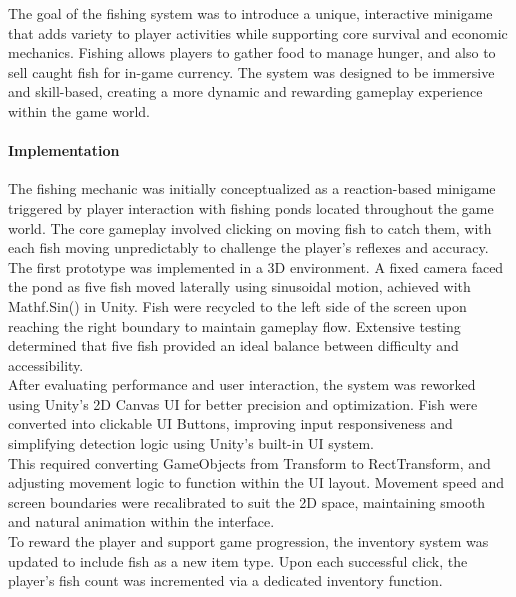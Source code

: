 \documentclass{article}
\begin{document}
The goal of the fishing system was to introduce a unique, interactive minigame that adds variety to player activities while supporting core survival and economic mechanics. Fishing allows players to gather food to manage hunger, and also to sell caught fish for in-game currency. The system was designed to be immersive and skill-based, creating a more dynamic and rewarding gameplay experience within the game world.

\paragraph{Implementation}\hfill

The fishing mechanic was initially conceptualized as a reaction-based minigame triggered by player interaction with fishing ponds located throughout the game world. The core gameplay involved clicking on moving fish to catch them, with each fish moving unpredictably to challenge the player's reflexes and accuracy.\\

The first prototype was implemented in a 3D environment. A fixed camera faced the pond as five fish moved laterally using sinusoidal motion, achieved with Mathf.Sin() in Unity. Fish were recycled to the left side of the screen upon reaching the right boundary to maintain gameplay flow. Extensive testing determined that five fish provided an ideal balance between difficulty and accessibility.\\

After evaluating performance and user interaction, the system was reworked using Unity's 2D Canvas UI for better precision and optimization. Fish were converted into clickable UI Buttons, improving input responsiveness and simplifying detection logic using Unity's built-in UI system.\\

This required converting GameObjects from Transform to RectTransform, and adjusting movement logic to function within the UI layout. Movement speed and screen boundaries were recalibrated to suit the 2D space, maintaining smooth and natural animation within the interface.\\

To reward the player and support game progression, the inventory system was updated to include fish as a new item type. Upon each successful click, the player's fish count was incremented via a dedicated inventory function.\\
\end{document}
